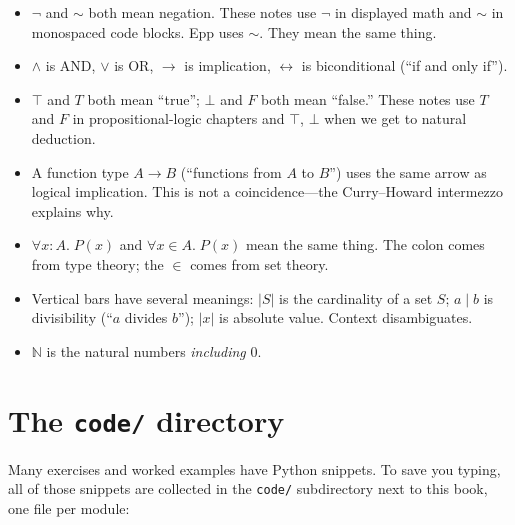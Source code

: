 \documentclass[11pt]{article}
\begin{document}
\begin{itemize}
  \item $\lnot$ and $\sim$ both mean negation. These notes use $\lnot$ in displayed math and $\sim$ in monospaced code blocks. Epp uses $\sim$. They mean the same thing.
  \item $\wedge$ is AND, $\vee$ is OR, $\to$ is implication, $\leftrightarrow$ is biconditional (``if and only if'').
  \item $\top$ and $T$ both mean ``true''; $\bot$ and $F$ both mean ``false.'' These notes use $T$ and $F$ in propositional-logic chapters and $\top$, $\bot$ when we get to natural deduction.
  \item A function type $A \to B$ (``functions from $A$ to $B$'') uses the same arrow as logical implication. This is not a coincidence---the Curry--Howard intermezzo explains why.
  \item $\forall x : A.\; P(x)$ and $\forall x \in A.\; P(x)$ mean the same thing. The colon comes from type theory; the $\in$ comes from set theory.
  \item Vertical bars have several meanings: $|S|$ is the cardinality of a set $S$; $a \mid b$ is divisibility (``$a$ divides $b$''); $|x|$ is absolute value. Context disambiguates.
  \item $\mathbb{N}$ is the natural numbers \emph{including} $0$.
\end{itemize}

\section*{The \texttt{code/} directory}

Many exercises and worked examples have Python snippets. To save you
typing, all of those snippets are collected in the \texttt{code/}
subdirectory next to this book, one file per module:
\end{document}
